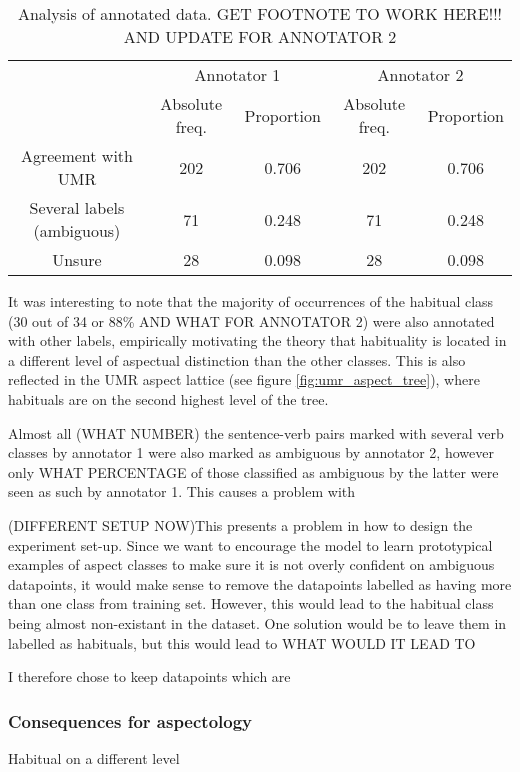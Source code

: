 \begin{table}
    \begin{tabular}{|c|c|c|c|c|}\hline
        & \multicolumn{2}{|c|}{Annotator 1} & \multicolumn{2}{|c|}{Annotator 2} \\
         & Absolute freq. & Proportion & Absolute freq. & Proportion  \\ \hline
        Agreement with UMR\footnotemark & 202 & 0.706 & 202 & 0.706 \\ \hline
        Several labels (ambiguous) & 71 & 0.248 & 71 & 0.248 \\\hline
        Unsure & 28 & 0.098 & 28 & 0.098\\\hline
    \end{tabular}
    \caption{Analysis of annotated data. GET FOOTNOTE TO WORK HERE!!! AND UPDATE FOR ANNOTATOR 2}
\end{table}
\label{table:annot_results}

It was interesting to note that the majority of occurrences of the habitual class (30 out of 34 or 88\% AND WHAT FOR ANNOTATOR 2) were also annotated with other labels, empirically motivating the theory that habituality is located in a different level of aspectual distinction than the other classes. This is also reflected in the UMR aspect lattice (see figure \ref{fig:umr_aspect_tree}), where habituals are on the second highest level of the tree. 

Almost all (WHAT NUMBER) the sentence-verb pairs marked with several verb classes by annotator 1 were also marked as ambiguous by annotator 2, however only WHAT PERCENTAGE of those classified as ambiguous by the latter were seen as such by annotator 1. This causes a problem with 

(DIFFERENT SETUP NOW)This presents a problem in how to design the experiment set-up. Since we want to encourage the model to learn prototypical examples of aspect classes to make sure it is not overly confident on ambiguous datapoints, it would make sense to remove the datapoints labelled as having more than one class from training set. However, this would lead to the habitual class being almost non-existant in the dataset. One solution would be to leave them in labelled as habituals, but this would lead to WHAT WOULD IT LEAD TO

I therefore chose to keep datapoints which are 

\subsubsection{Consequences for aspectology}
Habitual on a different level

